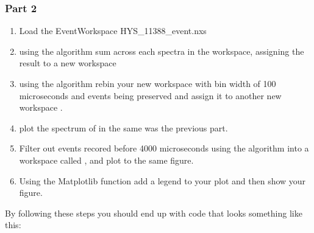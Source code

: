\documentclass[letterpaper,10pt,english,openany]{sphinxmanual}
\begin{document}
\subsubsection{Part 2}
\label{\detokenize{mantid_basic_course/using_workbench/05_Exercises:part-2}}\begin{enumerate}
\def\theenumi{\arabic{enumi}}
\def\labelenumi{\theenumi .}
\makeatletter\def\p@enumii{\p@enumi \theenumi .}\makeatother
\item {} 
Load the EventWorkspace HYS\_11388\_event.nxs

\item {} 
using the  algorithm sum across each spectra in the workspace, assigning the result to a new workspace 

\item {} 
using the  algorithm rebin your new  workspace with bin width of 100 microseconds and events being preserved and assign it to another new workspace .

     

\item {} 
plot the spectrum of  in the same was the previous part.

\item {} 
Filter out events recored before 4000 microseconds using the  algorithm into a workspace called , and plot  to the same figure.

\item {} 
Using the Matplotlib function add a legend to your plot  and then show your figure.

\end{enumerate}

By following these steps you should end up with code that looks something like this:
\end{document}
